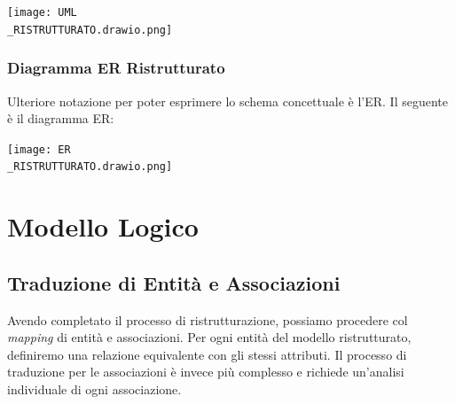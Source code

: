 \documentclass{article}
\begin{document}
{	\begin{center}
		\texttt{[image: UML\\\_RISTRUTTURATO.drawio.png]}
	\end{center}
	
	\newpage
	
	\subsubsection{Diagramma ER Ristrutturato}
	Ulteriore notazione per poter esprimere lo schema concettuale \`e l’ER. Il seguente \`e il diagramma ER:
	
	\begin{center}
		\texttt{[image: ER\\\_RISTRUTTURATO.drawio.png]}
	\end{center}
	
	
	\newpage
	
	\section{Modello Logico}
	
	\subsection{Traduzione di Entit\`a e Associazioni}
	Avendo completato il processo di ristrutturazione, possiamo procedere col \textit{mapping} di entit\`a e associazioni. Per ogni entit\`a del modello ristrutturato, definiremo una relazione equivalente con gli stessi attributi. Il processo di traduzione per le associazioni \`e invece pi\`u complesso e richiede un’analisi individuale di ogni associazione.
	
}
\end{document}
